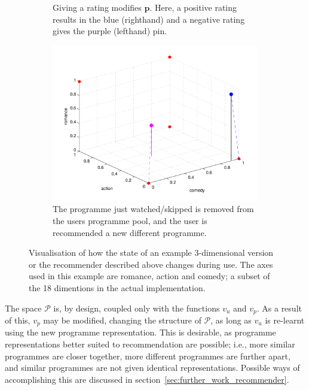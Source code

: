 \begin{figure}[h!]
\begin{center}
\begin{subfigure}[t]{0.32\textwidth}
				\caption{Giving a rating modifies $\mathbf{p}$. Here, a positive rating results in the blue (righthand) and a negative rating gives the purple (lefthand) pin.}
			\end{subfigure}
			\begin{subfigure}[t]{0.32\textwidth}
				\includegraphics[width=\textwidth]{images/recommender_3.pdf}
				\caption{The programme just watched/skipped is removed from the users programme pool, and the user is recommended a new different programme.}
			\end{subfigure}
			\caption{Visualisation of how the state of an example 3-dimensional version or the recommender described above changes during use. The axes used in this example are romance, action and comedy; a subset of the 18 dimentions in the actual implementation.}
			\label{fig:recommender_example}
		\end{center}
	\end{figure}

	The space $\mathcal{P}$ is, by design, coupled only with the functions $v_u$ and $v_p$. As a result of this, $v_p$ may be modified, changing the structure of $\mathcal{P}$, as long as $v_u$ is re-learnt using the new programme representation. This is desirable, as programme representations better suited to recommendation are possible; i.e., more similar programmes are closer together, more different programmes are further apart, and similar programmes are not given identical representations. Possible ways of accomplishing this are discussed in section~\ref{sec:further_work_recommender}.



